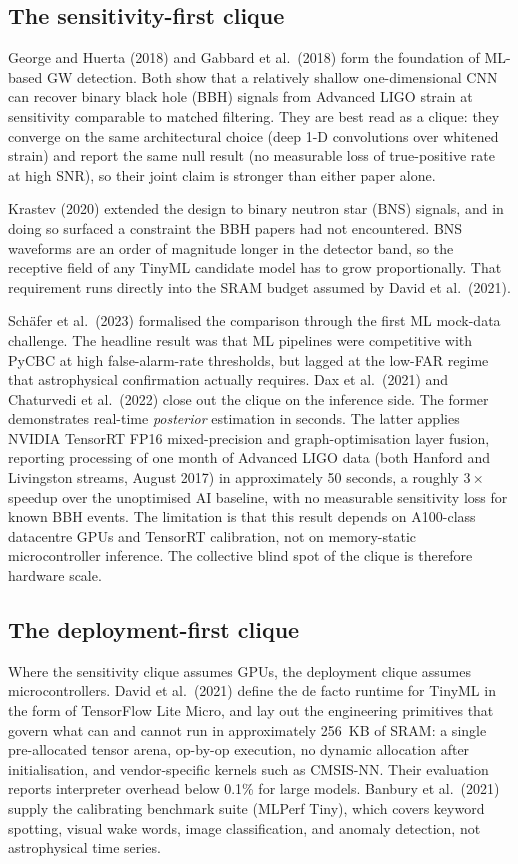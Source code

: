 \documentclass[11pt,a4paper]{article}
\begin{document}
\subsection{The sensitivity-first clique}
George and Huerta (2018) and Gabbard et al.\ (2018) form the foundation of ML-based GW detection. Both show that a relatively shallow one-dimensional CNN can recover binary black hole (BBH) signals from Advanced LIGO strain at sensitivity comparable to matched filtering. They are best read as a clique: they converge on the same architectural choice (deep 1-D convolutions over whitened strain) and report the same null result (no measurable loss of true-positive rate at high SNR), so their joint claim is stronger than either paper alone.

Krastev (2020) extended the design to binary neutron star (BNS) signals, and in doing so surfaced a constraint the BBH papers had not encountered. BNS waveforms are an order of magnitude longer in the detector band, so the receptive field of any TinyML candidate model has to grow proportionally. That requirement runs directly into the SRAM budget assumed by David et al.\ (2021).

Schäfer et al.\ (2023) formalised the comparison through the first ML mock-data challenge. The headline result was that ML pipelines were competitive with PyCBC at high false-alarm-rate thresholds, but lagged at the low-FAR regime that astrophysical confirmation actually requires. Dax et al.\ (2021) and Chaturvedi et al.\ (2022) close out the clique on the inference side. The former demonstrates real-time \textit{posterior} estimation in seconds. The latter applies NVIDIA TensorRT FP16 mixed-precision and graph-optimisation layer fusion, reporting processing of one month of Advanced LIGO data (both Hanford and Livingston streams, August 2017) in approximately 50 seconds, a roughly $3\times$ speedup over the unoptimised AI baseline, with no measurable sensitivity loss for known BBH events. The limitation is that this result depends on A100-class datacentre GPUs and TensorRT calibration, not on memory-static microcontroller inference. The collective blind spot of the clique is therefore hardware scale.

\subsection{The deployment-first clique}
Where the sensitivity clique assumes GPUs, the deployment clique assumes microcontrollers. David et al.\ (2021) define the de facto runtime for TinyML in the form of TensorFlow Lite Micro, and lay out the engineering primitives that govern what can and cannot run in approximately 256~KB of SRAM: a single pre-allocated tensor arena, op-by-op execution, no dynamic allocation after initialisation, and vendor-specific kernels such as CMSIS-NN. Their evaluation reports interpreter overhead below 0.1\% for large models. Banbury et al.\ (2021) supply the calibrating benchmark suite (MLPerf Tiny), which covers keyword spotting, visual wake words, image classification, and anomaly detection, not astrophysical time series.
\end{document}
